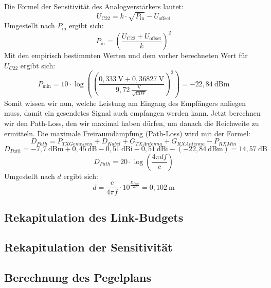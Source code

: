 Die Formel der Sensitivität des Analogverstärkers lautet:
\begin{equation}
    U_\text{C22} = k \cdot \sqrt{P_\text{in}} - U_\text{offset}
\end{equation}
Umgestellt nach $P_\text{in}$ ergibt sich:
\begin{equation}
    P_\text{in} = \left(\frac{U_\text{C22} + U_\text{offset}}{k}\right)^2
\end{equation}
Mit den empirisch bestimmten Werten und dem vorher berechneten Wert für $U_{C22}$ ergibt sich:
\begin{equation}
    P_\text{min} = 10 \cdot \log\left(\left(\frac{0{,}333~\mathrm{V} + 0{,}36827~\mathrm{V}}{9{,}72~\frac{\mathrm{V}}{\sqrt{\mathrm{mW}}}}\right)^2\right) = -22{,}84~\mathrm{dBm}
\end{equation}
Somit wissen wir nun, welche Leistung am Eingang des Empfängers anliegen muss, damit ein gesendetes Signal auch empfangen werden kann.
Jetzt berechnen wir den Path-Loss, den wir maximal haben dürfen, um danach die Reichweite zu ermitteln.
Die maximale Freiraumdämpfung (Path-Loss) wird mit der Formel:
\begin{equation}
    D_{Path} = P_{TXGemessen} + D_{Kabel} + G_{TXAntenna} + G_{RXAntenna} - P_{RXMin}
\end{equation}
\begin{equation}
    D_{Path} = -7{,}7~\mathrm{dBm} + 0{,}45~\mathrm{dB} -0{,}51~\mathrm{dBi} -0{,}51~\mathrm{dBi} - (-22{,}84~\mathrm{dBm}) = 14{,}57~\mathrm{dB}
\end{equation}
\begin{equation}
    D_{Path} = 20 \cdot \log\left(\frac{4 \pi d f}{c}\right)
\end{equation}
Umgestellt nach $d$ ergibt sich:
\begin{equation}
    d = \frac{c}{4 \pi f} \cdot 10^{\frac{D_{Path}}{20}}=0{,}102~\mathrm{m} 
\end{equation}
\subsection{Rekapitulation des Link-Budgets}
\subsection{Rekapitulation der Sensitivität}
\subsection{Berechnung des Pegelplans}